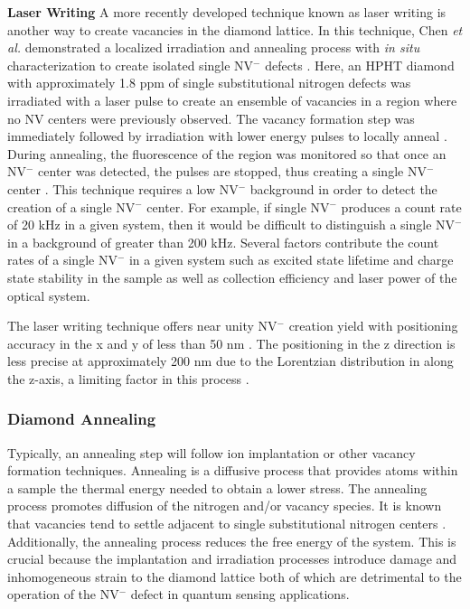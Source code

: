 \noindent\textbf{Laser Writing}
\newline \indent
    A more recently developed technique known as laser writing is another way to create vacancies in the diamond lattice. In this technique, Chen \textit{et al.} demonstrated a localized irradiation and annealing process with \textit{in situ} characterization to create isolated single NV$^-$ defects \cite{Chen2017LaserDiamond}. Here, an HPHT diamond with approximately 1.8 ppm of single substitutional nitrogen defects was irradiated with a laser pulse to create an ensemble of vacancies in a region where no NV centers were previously observed. The vacancy formation step was immediately followed by irradiation with lower energy pulses to locally anneal \cite{Chen2017LaserDiamond}. During annealing, the fluorescence of the region was monitored so that once an NV$^-$ center was detected, the pulses are stopped, thus creating a single NV$^-$ center \cite{Chen2017LaserDiamond}. This technique requires a low NV$^-$ background in order to detect the creation of a single NV$^-$ center. For example, if single NV$^-$ produces a count rate of 20 kHz in a given system, then it would be difficult to distinguish a single NV$^-$ in a background of greater than 200 kHz. Several factors contribute the count rates of a single NV$^-$ in a given system such as excited state lifetime and charge state stability in the sample as well as collection efficiency and laser power of the optical system\cite{Kirkpatrick2023OpticalDiamond}.

    The laser writing technique offers near unity NV$^-$ creation yield with positioning accuracy in the x and y of less than 50 nm \cite{Chen2019}. The positioning in the z direction is less precise at approximately 200 nm due to the Lorentzian distribution in along the z-axis, a limiting factor in this process \cite{Chen2019}.
    
    
\subsubsection{Diamond Annealing}
\label{annealing}
    Typically, an annealing step will follow ion implantation or other vacancy formation techniques. Annealing is a diffusive process that provides atoms within a sample the thermal energy needed to obtain a lower stress. The annealing process promotes diffusion of the nitrogen and/or vacancy species. It is known that vacancies tend to settle adjacent to single substitutional nitrogen centers \cite{Savage2021}. Additionally, the annealing process reduces the free energy of the system. This is crucial because the implantation and irradiation processes introduce damage and inhomogeneous strain to the diamond lattice  both of which are detrimental to the operation of the NV$^-$ defect in quantum sensing applications.
    
